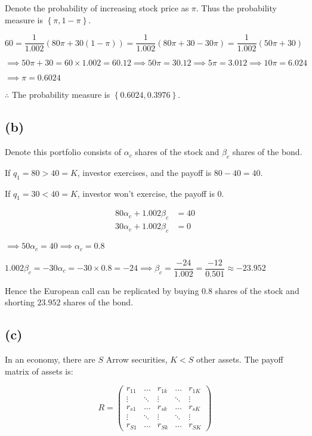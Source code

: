 \documentclass{article}
\begin{document}
Denote the probability of increasing stock price as $\pi$. Thus the probability measure is $\left\{\pi, 1-\pi\right\}$.

$60=\dfrac{1}{1.002}\left(80\pi+30\left(1-\pi\right)\right)=\dfrac{1}{1.002}\left(80\pi+30-30\pi\right)=\dfrac{1}{1.002}\left(50\pi+30\right)$

$\implies 50\pi+30=60\times1.002=60.12\implies50\pi=30.12\implies5\pi=3.012\implies10\pi=6.024$

$\implies\pi=0.6024$

$\therefore$ The probability measure is $\boxed{\left\{0.6024, 0.3976\right\}}$.

\subsection*{(b)}

Denote this portfolio consists of $\alpha_{c}$ shares of the stock and $\beta_{c}$ shares of the bond.

If $q_{1}=80>40=K$, investor exercises, and the payoff is $80-40=40$.

If $q_{1}=30<40=K$, investor won't exercise, the payoff is $0$. 

\begin{align*} 
    80\alpha_{c} + 1.002\beta_{c} &=  40 \\ 
    30\alpha_{c} + 1.002\beta_{c} &=  0
\end{align*}

$\implies 50\alpha_{c}=40\implies\alpha_{c}=0.8$

$1.002\beta_{c}=-30\alpha_{c}=-30\times0.8=-24\implies\beta_{c}=\dfrac{-24}{1.002}=\dfrac{-12}{0.501}\approx-23.952$

Hence the European call can be replicated by buying $0.8$ shares of the stock and shorting $23.952$ shares of the bond.

\subsection*{(c)}

In an economy, there are $S$ Arrow securities, $K<S$ other assets. The payoff matrix of assets is:

\begin{equation*}
    R=\begin{pmatrix}
        r_{11} & \dots & r_{1k} & \dots & r_{1K} \\
        \vdots & \ddots & \vdots & \ddots & \vdots\\
        r_{s1} & \dots & r_{sk} & \dots & r_{sK} \\
        \vdots & \ddots & \vdots & \ddots & \vdots\\
        r_{S1} & \dots & r_{Sk} & \dots & r_{SK}
    \end{pmatrix}
\end{equation*}
\end{document}
